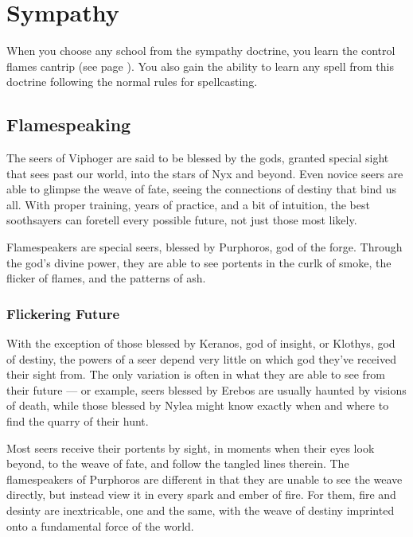 \section{Sympathy} \label{sec::sympathy}
When you choose any school from the sympathy doctrine, you learn the control flames cantrip (see page \pageref{spell::controlflames}).
You also gain the ability to learn any spell from this doctrine following the normal rules for spellcasting.

\subsection*{Flamespeaking} \label{ssec::flamespeaking}

    The seers of Viphoger are said to be blessed by the gods, granted special sight that sees past our world, into the stars of Nyx and beyond.
    Even novice seers are able to glimpse the weave of fate, seeing the connections of destiny that bind us all.
    With proper training, years of practice, and a bit of intuition, the best soothsayers can foretell every possible future, not just those most likely.

    Flamespeakers are special seers, blessed by Purphoros, god of the forge.
    Through the god's divine power, they are able to see portents in the curlk of smoke, the flicker of flames, and the patterns of ash.

    \subsubsection{Flickering Future}
        With the exception of those blessed by Keranos, god of insight, or Klothys, god of destiny, the powers of a seer depend very little on which god they've received their sight from.
        The only variation is often in what they are able to see from their future --- or example, seers blessed by Erebos are usually haunted by visions of death, while those blessed by Nylea might know exactly when and where to find the quarry of their hunt.

        Most seers receive their portents by sight, in moments when their eyes look beyond, to the weave of fate, and follow the tangled lines therein.
        The flamespeakers of Purphoros are different in that they are unable to see the weave directly, but instead view it in every spark and ember of fire.
        For them, fire and desinty are inextricable, one and the same, with the weave of destiny imprinted onto a fundamental force of the world.

